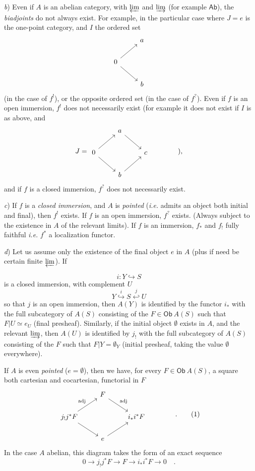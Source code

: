 \documentclass[11pt]{article}
\newcommand{\printedpage}[1]{\marginpar{\footnotesize p.~#1}}
\newcommand{\msp}[1]{\marginpar{\footnotesize [#1]}}
\newcommand{\Ob}{\mathsf{Ob}}
\newcommand{\Ab}{\mathsf{Ab}}
\begin{document}
\textit{b}) Even if $A$ is an abelian category, with $\varprojlim$ and $\varinjlim$ (for example $\Ab$), the \textit{biadjoints} do not always exist. For example, in the particular case where $J=e$ is the one-point category, and $I$ the ordered set
\[
\begin{tikzcd}
 & a \\
0 \arrow[ur] \arrow[dr] & \\
 & b
\end{tikzcd}
\]
(in the case of $f^{!}$), or the opposite ordered set (in the case of $f^{?}$). Even if $f$ is an open immersion, $f^{!}$ does not necessarily exist (for example it does not exist if $I$ is as above, and
\[
J=\begin{tikzcd}
 & a \arrow[dr] & \\
0 \arrow[ur] \arrow[dr] & & c \\
 & b \arrow[ur] &
\end{tikzcd}
\qquad\qquad \text{),}
\]
and if $f$ is a closed immersion, $f^{?}$ does not necessarily exist.

\textit{c}) If $f$ is a \textit{closed immersion}, and $A$ is \textit{pointed} (\textit{i.e.} admits an object both initial and final), then $f^{!}$ exists. If $f$ is an open immersion, $f^{?}$ exists. (Always subject
\printedpage{2}
to the existence in $A$ of the relevant limits). If $f$ is an immersion, $f_{*}$ and $f_{!}$ fully faithful \textit{i.e.} $f^{*}$ a localization functor.

\textit{d}) Let us assume only the existence of the final object $e$ in $A$ (plus if need be certain finite $\varprojlim$). If

\msp{page 2}
\[
i : Y \hookrightarrow S
\]
is a closed immersion, with complement $U$
\[
Y \overset{i}{\hookrightarrow} S \overset{j}{\hookleftarrow} U
\]
so that $j$ is an open immersion, then $A(Y)$ is identified by the functor $i_{*}$ with the full subcategory of $A(S)$ consisting of the $F \in \Ob\ A(S)$ such that $F|U \simeq e_{U}$ (final presheaf). Similarly, if the initial object $\emptyset$ exists in $A$, and the relevant $\varinjlim$, then $A(U)$ is identified by $j_{!}$ with the full subcategory of $A(S)$ consisting of the $F$ such that $F|Y=\emptyset_{Y}$ (initial presheaf, taking the value $\emptyset$ everywhere).

If $A$ is even \textit{pointed} ($e=\emptyset$), then we have, for every $F\in \Ob\ A(S)$, a square both cartesian and cocartesian, functorial in $F$
\[
\begin{tikzcd}
 & F \arrow[dr, "\text{adj}"] & \\
j_{!}j^{*}F \arrow[ur, "\text{adj}"] \arrow[dr] & & i_{*}i^{*}F \\
 & e \arrow[ur] &
\end{tikzcd}
\qquad\qquad \text{.}
\tag*{(1)}
\]
In the case $A$ abelian, this diagram takes the form of an exact sequence
\[
0 \longrightarrow j_{!}j^{*}F \longrightarrow F \longrightarrow i_{*}i^{*}F \longrightarrow 0 \quad .
\]
\end{document}
